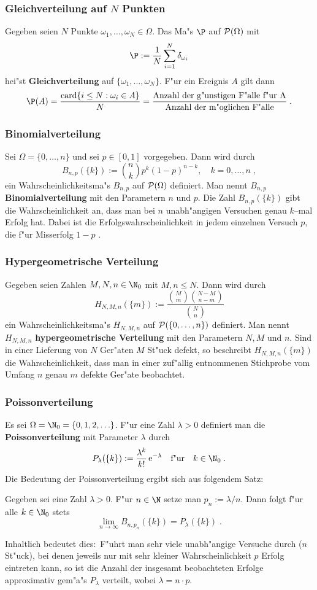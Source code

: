 \subsubsection{Gleichverteilung auf $N$ Punkten}
Gegeben seien $N$ Punkte $\omega_1,\ldots,\omega_N\in\Omega$.
Das Ma"s $\P$ auf $\mathcal P(\Omega)$ mit
$$
\P:=\frac{1}{N}\sum_{i=1}^N \delta_{\omega_i}
$$
hei"st \textbf{Gleichverteilung} auf $\{\omega_1,\ldots,\omega_N\}$. F"ur ein Ereignis $A$ gilt dann
$$
\P(A)=\frac{\mathrm{card}\{ i\le N : \omega_i\in A\}}{N}=
\frac{\mbox{Anzahl der g"unstigen F"alle f"ur A}}{\mbox{Anzahl der m"oglichen F"alle}}\;.
$$
\subsubsection{Binomialverteilung}
Sei $\Omega=\{0,\ldots,n\}$ und sei $p\in[0,1]$ vorgegeben. Dann wird durch
$$
B_{n,p}(\{k\}):={n\choose k} p^k(1-p)^{n-k},\quad k=0,\ldots,n\;,
$$
ein Wahrscheinlichkeitsma"s $B_{n,p}$ auf $\mathcal P(\Omega)$ definiert. Man nennt $B_{n,p}$
\textbf{Binomialverteilung} mit den Parametern $n$ und $p$. Die Zahl
$B_{n,p}(\{k\})$ gibt die Wahrscheinlichkeit an, dass man bei $n$ unabh"angigen Versuchen genau $k$--mal
Erfolg hat. Dabei ist die Erfolgswahrscheinlichkeit in jedem einzelnen Versuch $p$, die f"ur
Misserfolg $1-p$ .
\subsubsection{Hypergeometrische Verteilung}
Gegeben seien Zahlen $M,N,n\in\N_0$ mit $M,n\le N$. Dann wird durch
$$
H_{N, M ,n}(\{m\}) :=\frac{{M\choose m}{N-M\choose n-m}}{{N\choose n}}
$$
ein Wahrscheinlichkeitsma"s $H_{N,M,n}$ auf $\mathcal P(\{0,\ldots,n\})$
definiert. Man nennt $H_{N,M,n}$  \textbf{hypergeometrische Verteilung} mit den Parametern $N,M$ und $n$.
Sind in einer Lieferung von $N$ Ger"aten $M$ St"uck defekt, so beschreibt $H_{N,M,n}(\{m\})$
die Wahrscheinlichkeit, dass man in einer zuf"allig entnommenen Stichprobe vom Umfang $n$ genau
$m$ defekte Ger"ate beobachtet.
\subsubsection{Poissonverteilung}
Es sei $\Omega=\N_0=\{0,1,2,\ldots\}$. F"ur eine Zahl $\lambda>0$ definiert
man die \textbf{Poissonverteilung} mit Parameter $\lambda$ durch
$$
P_\lambda(\{k\}):= \frac{\lambda^k}{k !}\,\mathrm e^{-\lambda}\quad\mbox{f"ur}\quad k\in\N_0\;.
$$
Die Bedeutung der Poissonverteilung ergibt sich aus folgendem Satz$\colon$
\begin{thm}
Gegeben sei eine Zahl $\lambda>0$. F"ur $n\in\N$ setze man
$p_n:=\lambda/n$. Dann folgt f"ur alle $k\in\N_0$
stets
$$
\lim_{n\to\infty} B_{n,p_n}(\{k\})= P_\lambda(\{k\})\;.
$$
\end{thm}
Inhaltlich bedeutet dies$\colon$ F"uhrt man sehr viele unabh"angige Versuche durch ($n$ St"uck), bei denen jeweils
nur mit sehr kleiner
Wahrscheinlichkeit $p$ Erfolg eintreten kann, so ist die Anzahl der insgesamt beobachteten Erfolge
approximativ gem"a"s $P_\lambda$ verteilt, wobei $\lambda= n\cdot p$.
